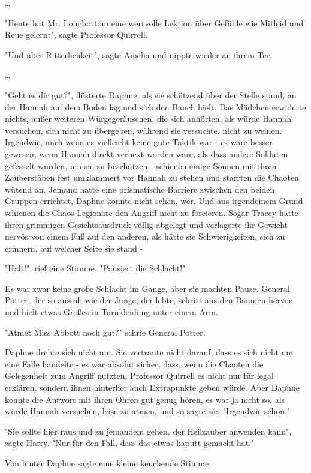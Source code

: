 {…

"Heute hat Mr. Longbottom eine wertvolle Lektion über Gefühle wie Mitleid und Reue gelernt", sagte Professor Quirrell.

"Und über Ritterlichkeit", sagte Amelia und nippte wieder an ihrem Tee.

…

"Geht es dir gut?", flüsterte Daphne, als sie schützend über der Stelle stand, an der Hannah auf dem Boden lag und sich den Bauch hielt. Das Mädchen erwiderte nichts, außer weiteren Würgegeräuschen, die sich anhörten, als würde Hannah versuchen, sich nicht zu übergeben, während sie versuchte, nicht zu weinen. Irgendwie, auch wenn es vielleicht keine gute Taktik war - es wäre besser gewesen, wenn Hannah direkt verhext worden wäre, als dass andere Soldaten gefesselt wurden, um sie zu beschützen - schienen einige Sonnen mit ihren Zauberstäben fest umklammert vor Hannah zu stehen und starrten die Chaoten wütend an. Jemand hatte eine prismatische Barriere zwischen den beiden Gruppen errichtet, Daphne konnte nicht sehen, wer. Und aus irgendeinem Grund schienen die Chaos Legionäre den Angriff nicht zu forcieren. Sogar Tracey hatte ihren grimmigen Gesichtsausdruck völlig abgelegt und verlagerte ihr Gewicht nervös von einem Fuß auf den anderen, als hätte sie Schwierigkeiten, sich zu erinnern, auf welcher Seite sie stand -

"Halt!", rief eine Stimme. "Pausiert die Schlacht!"

Es war zwar keine große Schlacht im Gange, aber sie machten Pause. General Potter, der so aussah wie der Junge, der lebte, schritt aus den Bäumen hervor und hielt etwas Großes in Tarnkleidung unter einem Arm.

"Atmet Miss Abbott noch gut?" schrie General Potter.

Daphne drehte sich nicht um. Sie vertraute nicht darauf, dass es sich nicht um eine Falle handelte - es war absolut sicher, dass, wenn die Chaoten die Gelegenheit zum Angriff nutzten, Professor Quirrell es nicht nur für legal erklären, sondern ihnen hinterher auch Extrapunkte geben würde. Aber Daphne konnte die Antwort mit ihren Ohren gut genug hören, es war ja nicht so, als würde Hannah versuchen, leise zu atmen, und so sagte sie: "Irgendwie schon."

"Sie sollte hier raus und zu jemandem gehen, der Heilzauber anwenden kann", sagte Harry. "Nur für den Fall, dass das etwas kaputt gemacht hat."

Von hinter Daphne sagte eine kleine keuchende Stimme:

}
